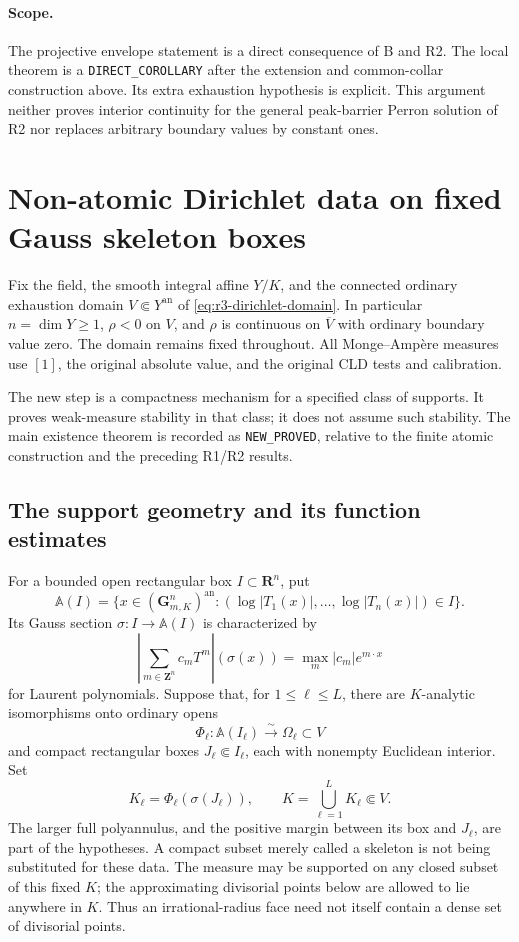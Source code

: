 \documentclass[11pt,a4paper]{article}
\numberwithin{equation}{section}
\theoremstyle{definition}
\theoremstyle{remark}
\newcommand{\an}{\mathrm{an}}
\begin{document}
\paragraph{Scope.}
The projective envelope statement is a direct consequence of B
and R2. The local theorem is a \texttt{DIRECT\_COROLLARY} after
the extension and common-collar construction above. Its extra
exhaustion hypothesis is explicit. This argument neither proves
interior continuity for the general peak-barrier Perron solution
of R2 nor replaces arbitrary boundary values by constant ones.



\section{Non-atomic Dirichlet data on fixed Gauss skeleton boxes}
\label{sec:r3-skeletal-dirichlet}

Fix the field, the smooth integral affine $Y/K$, and the connected
ordinary exhaustion domain $V\Subset Y^{\an}$ of
\eqref{eq:r3-dirichlet-domain}. In particular $n=\dim Y\geq1$,
$\rho<0$ on $V$, and $\rho$ is continuous on $\overline V$ with
ordinary boundary value zero. The domain remains fixed throughout.
All Monge--Amp\`ere measures use $[1]$, the original absolute value,
and the original CLD tests and calibration.

The new step is a compactness mechanism for a specified class of
supports. It proves weak-measure stability in that class; it does not
assume such stability. The main existence theorem is recorded as
\texttt{NEW\_PROVED}, relative to the finite atomic construction and
the preceding R1/R2 results.

\subsection{The support geometry and its function estimates}

For a bounded open rectangular box $I\subset\mathbf R^n$, put
\[
 \mathbb A(I)=
 \{x\in(\mathbf G_{m,K}^n)^{\an}:
              (\log|T_1(x)|,\ldots,\log|T_n(x)|)\in I\}.
\]
Its Gauss section $\sigma:I\to\mathbb A(I)$ is characterized by
\[
 \left|\sum_{m\in\mathbf Z^n}c_mT^m\right|(\sigma(x))
          =\max_m |c_m|e^{m\cdot x}
\]
for Laurent polynomials. Suppose that, for $1\leq\ell\leq L$,
there are $K$-analytic isomorphisms onto ordinary opens
\[
 \Phi_\ell:\mathbb A(I_\ell)\xrightarrow{\sim}\Omega_\ell
          \subset V
\]
and compact rectangular boxes $J_\ell\Subset I_\ell$, each with
nonempty Euclidean interior. Set
\[
 K_\ell=\Phi_\ell(\sigma(J_\ell)),\qquad
 K=\bigcup_{\ell=1}^L K_\ell\Subset V.
 \tag{S}\label{eq:r3-gauss-box-support}
\]
The larger full polyannulus, and the positive margin between its box
and $J_\ell$, are part of the hypotheses. A compact subset merely
called a skeleton is not being substituted for these data.
The measure may be supported on any closed subset of this fixed $K$;
the approximating divisorial points below are allowed to lie anywhere
in $K$. Thus an irrational-radius face need not itself contain a
dense set of divisorial points.
\end{document}
